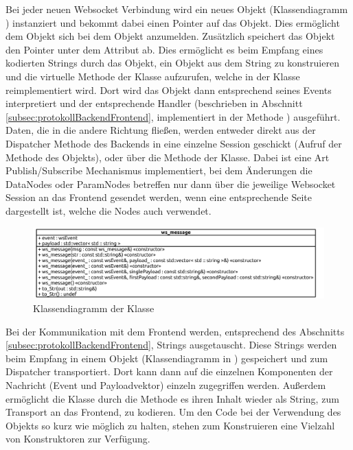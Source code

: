 Bei jeder neuen Websocket Verbindung wird ein neues  Objekt (Klassendiagramm ) instanziert 
und bekommt dabei einen Pointer auf das  Objekt. Dies ermöglicht dem  Objekt 
sich bei dem  Objekt anzumelden. 
Zusätzlich speichert das  Objekt den Pointer unter dem Attribut  ab.
Dies ermöglicht es beim Empfang eines kodierten Strings durch das  Objekt, ein  Objekt aus dem String zu konstruieren
und die virtuelle Methode  der  Klasse aufzurufen, welche in der  Klasse reimplementiert wird.
Dort wird das  Objekt dann entsprechend seines Events interpretiert und der entsprechende Handler (beschrieben in Abschnitt \ref{subsec:protokollBackendFrontend}, 
implementiert in der Methode ) ausgeführt.
Daten, die in die andere Richtung fließen, werden entweder direkt aus der Dispatcher Methode des Backends in eine einzelne Session geschickt (Aufruf der Methode  des  Objekts), 
oder über die Methode  der  Klasse.
Dabei ist eine Art Publish/Subscribe Mechanismus implementiert, bei dem Änderungen die DataNodes oder ParamNodes betreffen nur dann über die jeweilige Websocket Session an das Frontend gesendet werden, 
wenn eine entsprechende Seite dargestellt ist, welche die Nodes auch verwendet.
\begin{figure}[ht]
  \centering
  \includegraphics[width=\textwidth]{content/hauptteil/umsetzungPoC/backend/uml/classesOfOverview/ws_message.pdf}
  \caption{Klassendiagramm der Klasse }
  \label{fig:backend:classDiag:wsMsg}
\end{figure}
Bei der Kommunikation mit dem Frontend werden, entsprechend des Abschnitts \ref{subsec:protokollBackendFrontend}, Strings ausgetauscht. 
Diese Strings werden beim Empfang in einem  Objekt (Klassendiagramm in ) gespeichert und zum Dispatcher transportiert. 
Dort kann dann auf die einzelnen Komponenten der Nachricht (Event und Payloadvektor) einzeln zugegriffen werden.
Außerdem ermöglicht die Klasse durch die Methode  es ihren Inhalt wieder als String, zum Transport an das Frontend, zu kodieren.
Um den Code bei der Verwendung des  Objekts so kurz wie möglich zu halten, stehen zum Konstruieren eine Vielzahl von Konstruktoren zur Verfügung.
